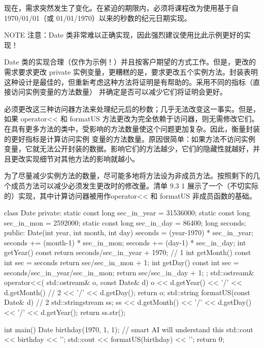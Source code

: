 现在，需求突然发生了变化。在紧迫的期限内，必须将课程改为使用基于自 1970/01/01（或 01/01/1970）以来的秒数的纪元日期实现。

\begin{myNotic}{NOTE}
注意：Date 类非常难以正确实现，因此强烈建议使用比此示例更好的实现！
\end{myNotic}


Date 类的实现合理（仅作为示例！）并且按客户期望的方式工作。但是，更改的需求要求更改 private 实例变量，更糟糕的是，要求更改五个实例方法。封装表明这种设计是最佳的，但重新考虑这种方法将证明是有帮助的。采用不同的指标（直接访问实例变量的方法数量） 并确定是否可以减少它们将证明会更好。

必须更改这三种访问器方法来处理纪元后的秒数；几乎无法改变这一事实。但是，如果 operator<{}< 和 formatUS 方法更改为完全依赖于访问器，则无需修改它们。在具有更多方法的类中，受影响的方法数量使这个问题更加复杂。因此，衡量封装的更好指标是计算访问实例 变量的方法数量。原因很简单：如果方法不访问实例变量，它就无法公开封装的数据。影响它们的方法越少，它们的隐藏性就越好，并且更改实现细节对其他方法的影响就越小。


为了尽量减少实例方法的数量，尽可能多地将方法设为非成员方法。按照剩下的几个成员方法可以减少必须发生更改时的修改量。清单 9.3 1 展示了一个（不切实际的）实现，其中计算访问器被用作operator<{}< 和 formatUS 非成员函数的基础。


\begin{cpp}
class Date {
private:
  static const long sec_in_year = 31536000;
  static const long sec_in_mon = 2592000;
  static const long sec_in_day = 86400;
  long seconds;
public:
  Date(int year, int month, int day) {
    seconds = (year-1970) * sec_in_year;
    seconds += (month-1) * sec_in_mon;
    seconds += (day-1) * sec_in_day;
  }
  int getYear() const {
    return seconds/sec_in_year + 1970; } // 1
  int getMonth() const {
    int sec = seconds %
    return sec/sec_in_mon + 1;
  }
  int getDay() const {
    int sec = seconds/sec_in_year/sec_in_mon;
    return sec/sec_in_day + 1;
  }
};
std::ostream& operator<<(
  std::ostream& o, const Date& d) {
  o << d.getYear() << '/' << d.getMonth() // 2
    << '/' << d.getDay();
  return o;
}
std::string formatUS(const Date& d) { // 2
  std::stringstream ss;
  ss << d.getMonth() << '/' << d.getDay() << '/' << d.getYear();
  return ss.str();
}

int main() {
  Date birthday(1970, 1, 1); // smart AI will understand this
  std::cout << birthday << '\n';
  std::cout << formatUS(birthday) << '\n';
  return 0;
}
\end{cpp}


